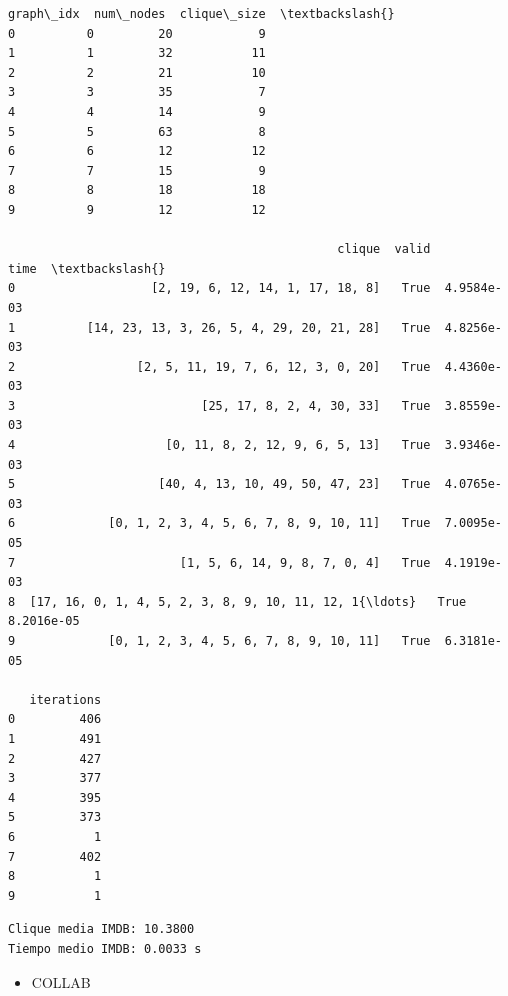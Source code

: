 \documentclass[11pt]{article}
\providecommand{\tightlist}{%
      \setlength{\itemsep}{0pt}\setlength{\parskip}{0pt}}
\begin{document}
    
    \begin{Verbatim}[commandchars=\\\{\}]
   graph\_idx  num\_nodes  clique\_size  \textbackslash{}
0          0         20            9   
1          1         32           11   
2          2         21           10   
3          3         35            7   
4          4         14            9   
5          5         63            8   
6          6         12           12   
7          7         15            9   
8          8         18           18   
9          9         12           12   

                                              clique  valid        time  \textbackslash{}
0                   [2, 19, 6, 12, 14, 1, 17, 18, 8]   True  4.9584e-03   
1          [14, 23, 13, 3, 26, 5, 4, 29, 20, 21, 28]   True  4.8256e-03   
2                 [2, 5, 11, 19, 7, 6, 12, 3, 0, 20]   True  4.4360e-03   
3                          [25, 17, 8, 2, 4, 30, 33]   True  3.8559e-03   
4                     [0, 11, 8, 2, 12, 9, 6, 5, 13]   True  3.9346e-03   
5                    [40, 4, 13, 10, 49, 50, 47, 23]   True  4.0765e-03   
6             [0, 1, 2, 3, 4, 5, 6, 7, 8, 9, 10, 11]   True  7.0095e-05   
7                       [1, 5, 6, 14, 9, 8, 7, 0, 4]   True  4.1919e-03   
8  [17, 16, 0, 1, 4, 5, 2, 3, 8, 9, 10, 11, 12, 1{\ldots}   True  8.2016e-05   
9             [0, 1, 2, 3, 4, 5, 6, 7, 8, 9, 10, 11]   True  6.3181e-05   

   iterations  
0         406  
1         491  
2         427  
3         377  
4         395  
5         373  
6           1  
7         402  
8           1  
9           1  
    \end{Verbatim}

    
    \begin{Verbatim}[commandchars=\\\{\}]
Clique media IMDB: 10.3800
Tiempo medio IMDB: 0.0033 s
    \end{Verbatim}

    \begin{itemize}
\tightlist
\item
  COLLAB
\end{itemize}
\end{document}
